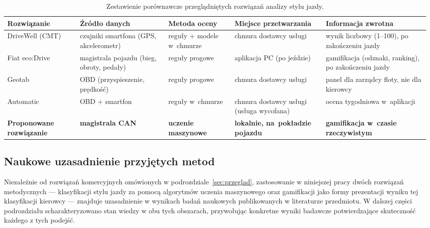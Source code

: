 \begin{table}[!h]
    \centering
    \caption{Zestawienie porównawcze przeglądniętych rozwiązań analizy stylu jazdy.}
    \label{tab:analiza-rozwiazan}
    \begin{tabular}{| p{2.6cm} | p{2.6cm} | p{2.6cm} | p{2.5cm} | p{3.0cm} |} \hline
        \textbf{Rozwiązanie} & \textbf{Źródło danych} & \textbf{Metoda oceny} & \textbf{Miejsce przetwarzania} & \textbf{Informacja zwrotna} \\ \hline\hline
        DriveWell (CMT)~\cite{cmtelematics} & czujniki smartfona (GPS, akcelerometr) & reguły + modele w~chmurze & chmura dostawcy usługi & wynik liczbowy (1--100), po zakończeniu jazdy \\ \hline
        Fiat eco:Drive~\cite{fiatecodrive,fiatecodrivesocial} & magistrala pojazdu (bieg, obroty, pedały) & reguły progowe & aplikacja PC (po jeździe) & gamifikacja (odznaki, ranking), po zakończeniu jazdy \\ \hline
        Geotab~\cite{geotab} & OBD (przyspieszenie, prędkość) & reguły progowe & chmura dostawcy usługi & panel dla zarządcy floty, nie dla kierowcy \\ \hline
        Automatic~\cite{automaticlabs} & OBD + smartfon & reguły w~chmurze & chmura dostawcy usługi (usługa wycofana) & ocena tygodniowa w~aplikacji \\ \hline
        \textbf{Proponowane rozwiązanie} & \textbf{magistrala CAN} & \textbf{uczenie maszynowe} & \textbf{lokalnie, na~pokładzie pojazdu} & \textbf{gamifikacja w~czasie rzeczywistym} \\ \hline
    \end{tabular}
\end{table}

\subsection{Naukowe uzasadnienie przyjętych metod}
\label{sec:uzasadnienie-metod}

Niezależnie od rozwiązań komercyjnych omówionych w podrozdziale~\ref{sec:przeglad},
zastosowanie w niniejszej pracy dwóch rozwiązań metodycznych --- klasyfikacji stylu
jazdy za pomocą algorytmów uczenia maszynowego oraz gamifikacji jako formy prezentacji
wyniku tej klasyfikacji kierowcy --- znajduje uzasadnienie w wynikach badań
naukowych publikowanych w literaturze przedmiotu. W dalszej części podrozdziału
scharakteryzowano stan wiedzy w obu tych obszarach, przywołując konkretne wyniki
badawcze potwierdzające skuteczność każdego z tych podejść.

